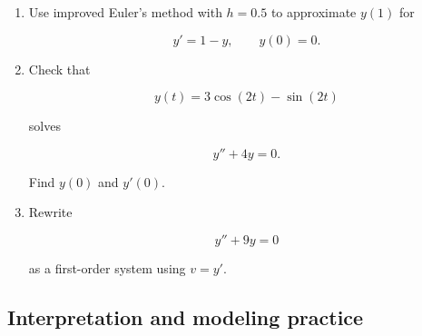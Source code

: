 \begin{enumerate}
\[
y'=1-y,
\qquad
y(0)=0.
\]

\item Use improved Euler's method with \(h=0.5\) to approximate \(y(1)\) for

\[
y'=1-y,
\qquad
y(0)=0.
\]

\item Check that

\[
y(t)=3\cos(2t)-\sin(2t)
\]

solves

\[
y''+4y=0.
\]

Find \(y(0)\) and \(y'(0)\).

\item Rewrite

\[
y''+9y=0
\]

as a first-order system using \(v=y'\).
\end{enumerate}

\subsection{Interpretation and modeling practice}
\label{subsec:de-interpretation-modeling-practice}

